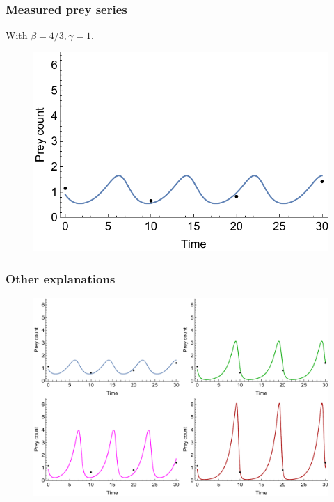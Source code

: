 \documentclass[handout]{beamer}
\begin{document}
\begin{frame}
	\frametitle{Measured prey series}
	
	With $\beta=4/3, \gamma=1$.
	
	\begin{figure}[ht]
		\centerline{\includegraphics[width=1\textwidth]{./figures/lotka-volterra-infer-1.pdf}}
	\end{figure}
	
\end{frame}

\begin{frame}
	\frametitle{Other explanations}
	
	\begin{figure}[ht]
		\centerline{\includegraphics[width=1\textwidth]{./figures/lotka-volterra-inference-other.pdf}}
	\end{figure}
	
\end{frame}
\end{document}
